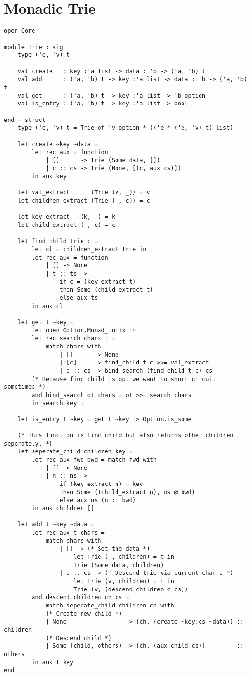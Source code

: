 \section{\\Monadic Trie}
\begin{verbatim}
open Core

module Trie : sig
    type ('e, 'v) t

    val create   : key :'a list -> data : 'b -> ('a, 'b) t
    val add      : ('a, 'b) t -> key :'a list -> data : 'b -> ('a, 'b) t
    val get      : ('a, 'b) t -> key :'a list -> 'b option
    val is_entry : ('a, 'b) t -> key :'a list -> bool

end = struct
    type ('e, 'v) t = Trie of 'v option * (('e * ('e, 'v) t) list)

    let create ~key ~data =
        let rec aux = function
            | []      -> Trie (Some data, [])
            | c :: cs -> Trie (None, [(c, aux cs)])
        in aux key

    let val_extract      (Trie (v, _)) = v
    let children_extract (Trie (_, c)) = c

    let key_extract   (k, _) = k
    let child_extract (_, c) = c

    let find_child trie c =
        let cl = children_extract trie in
        let rec aux = function
            | [] -> None
            | t :: ts ->
                if c = (key_extract t)
                then Some (child_extract t)
                else aux ts
        in aux cl

    let get t ~key =
        let open Option.Monad_infix in
        let rec search chars t =
            match chars with
                | []      -> None
                | [c]     -> find_child t c >>= val_extract
                | c :: cs -> bind_search (find_child t c) cs
        (* Because find child is opt we want to short circuit sometimes *)
        and bind_search ot chars = ot >>= search chars
        in search key t

    let is_entry t ~key = get t ~key |> Option.is_some

    (* This function is find child but also returns other children seperately. *)
    let seperate_child children key =
        let rec aux fwd bwd = match fwd with
            | [] -> None
            | n :: ns ->
                if (key_extract n) = key
                then Some ((child_extract n), ns @ bwd)
                else aux ns (n :: bwd)
        in aux children []

    let add t ~key ~data =
        let rec aux t chars =
            match chars with
                | [] -> (* Set the data *)
                    let Trie (_, children) = t in
                    Trie (Some data, children)
                | c :: cs -> (* Descend trie via current char c *)
                    let Trie (v, children) = t in
                    Trie (v, (descend children c cs))
        and descend children ch cs =
            match seperate_child children ch with
            (* Create new child *)
            | None                 -> (ch, (create ~key:cs ~data)) :: children
            (* Descend child *)
            | Some (child, others) -> (ch, (aux child cs))         :: others
        in aux t key
end
\end{verbatim}
